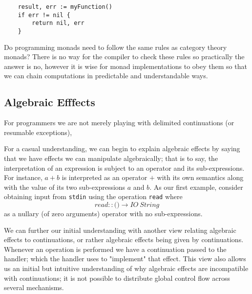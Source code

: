 \begin{verbatim}
    result, err := myFunction()
    if err != nil {
        return nil, err
    }
\end{verbatim}

Do programming monads need to follow the same rules as category theory monads?
There is no way for the compiler to check these rules so practically the answer is no,
however it is wise for monad implementations to obey them so that
we can chain computations in predictable and understandable ways.


\subsection{Algebraic Efffects}
For programmers
we are not merely playing with delimited continuations (or resumable exceptions),

For a casual understanding,
we can begin to explain algebraic effects by saying that
we have effects we can manipulate algebraically; that is to say,
the interpretation of an expression is
subject to an operator and its sub-expressions.
For instance, $a + b$ is interpreted as an operator
$+$ with its own semantics along with the value of its
two sub-expressions $a$ and $b$.
As our first example, consider obtaining input from
\texttt{stdin} using the operation \texttt{read} where
\begin{equation}
    read :: \texttt{()} \rightarrow IO\ String
\end{equation}
as a nullary (of zero arguments) operator with no sub-expressions.

We can further our initial understanding with another view
relating algebraic effects to continuations,
or rather algebraic effects being given by continuations.
Whenever an operation is performed we have a continuation
passed to the handler;
which the handler uses to "implement" that effect.
This view also allows us an initial but intuitive
understanding of why algebraic effects are incompatible with continuations;
it is not possible to distribute global control flow across several mechanisms.


